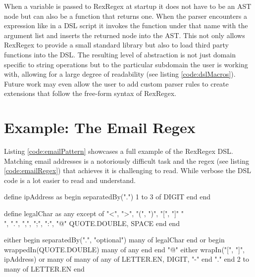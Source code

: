 When a variable is passed to RexRegex at startup it does not have to be an AST node but can also be a function that returns one. When the parser encounters a expression like  in a DSL script it invokes the function under that name with the argument list and inserts the returned node into the AST. This not only allows RexRegex to provide a small standard library but also to load third party functions into the DSL. The resulting level of abstraction is not just domain specific to string operations but to the particular subdomain the user is working with, allowing for a large degree of readability (see listing \ref{code:dslMacros}). Future work may even allow the user to add custom parser rules to create extensions that follow the free-form syntax of RexRegex.

\section{Example: The Email Regex}

Listing \ref{code:emailPattern} showcases a full example of the RexRegex DSL. Matching email addresses is a notoriously difficult task and the regex (see listing \ref{code:emailRegex}) that achieves it is challenging to read. While verbose the DSL code is a lot easier to read and understand.


\begin{listingBox}[float=htb,title={Regex for Validating Email Addresses},label=code:emailRegex]
    
\end{listingBox}

\begin{rexregexBox}[title={RexRegex Code for Validating Email Addresses},breakable,label=code:emailPattern,width=13cm,center,listing options={style=rexregex,basicstyle=\small\ttfamily}]
define ipAddress as
    begin separatedBy(".")
        1 to 3 of DIGIT
    end
end

define legalChar as
    any except of
        "<", ">", "(", ")", "[", "]"
        "\\", ".", ",", ";", ":", "@"
        QUOTE.DOUBLE, SPACE
    end
end

either
    begin separatedBy(".", "optional")
        many of legalChar
    end
or
    begin wrappedIn(QUOTE.DOUBLE)
        many of any
    end
end
"@"
either
    wrapIn("[", "]", ipAddress)
or
    many of
        many of
            any of LETTER.EN, DIGIT, "-"
        end
        "."
    end
    2 to many of LETTER.EN
end
\end{rexregexBox}


